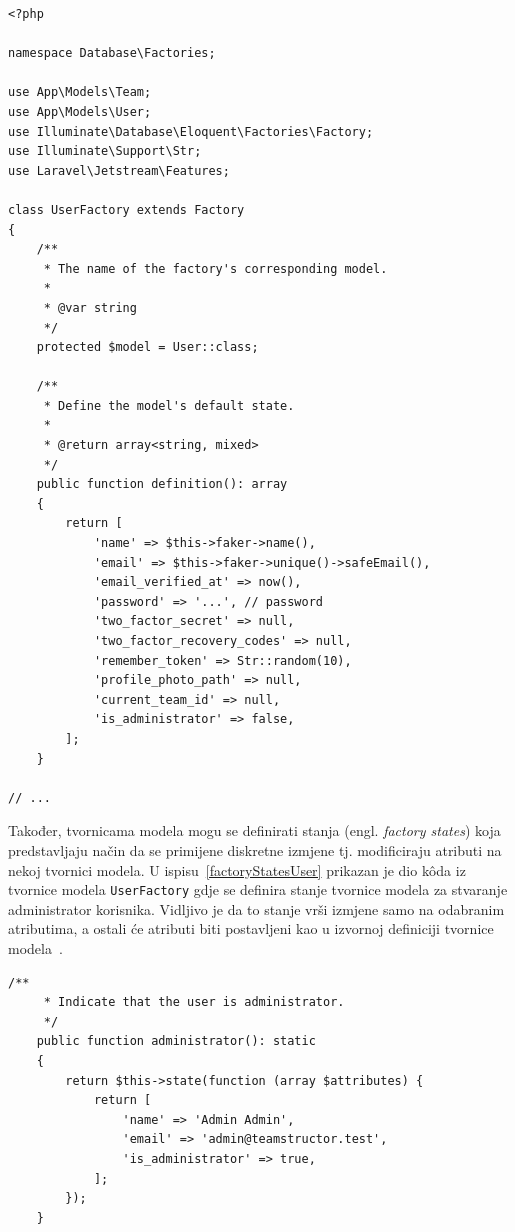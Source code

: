 \begin{lstlisting}[caption={Dio k\^oda tvornice modela \texttt{UserFactory}}, label=factoryUser]
<?php

namespace Database\Factories;

use App\Models\Team;
use App\Models\User;
use Illuminate\Database\Eloquent\Factories\Factory;
use Illuminate\Support\Str;
use Laravel\Jetstream\Features;

class UserFactory extends Factory
{
    /**
     * The name of the factory's corresponding model.
     *
     * @var string
     */
    protected $model = User::class;

    /**
     * Define the model's default state.
     *
     * @return array<string, mixed>
     */
    public function definition(): array
    {
        return [
            'name' => $this->faker->name(),
            'email' => $this->faker->unique()->safeEmail(),
            'email_verified_at' => now(),
            'password' => '...', // password
            'two_factor_secret' => null,
            'two_factor_recovery_codes' => null,
            'remember_token' => Str::random(10),
            'profile_photo_path' => null,
            'current_team_id' => null,
            'is_administrator' => false,
        ];
    }
    
// ...
\end{lstlisting}

Također, tvornicama modela mogu se definirati stanja (engl. \textit{factory states}) koja predstavljaju način da se primijene diskretne izmjene tj. modificiraju atributi na nekoj tvornici modela. U ispisu~\ref{factoryStatesUser} prikazan je dio k\^oda iz tvornice modela \texttt{UserFactory} gdje se definira stanje tvornice modela za stvaranje administrator korisnika. Vidljivo je da to stanje vrši izmjene samo na odabranim atributima, a ostali će atributi biti postavljeni kao u izvornoj definiciji tvornice modela~\cite{factories}.

\begin{lstlisting}[caption={Dio k\^oda tvornice modela \texttt{UserFactory} koji prikazuje definiciju stanja tvornice modela}, label=factoryStatesUser]
    /**
     * Indicate that the user is administrator.
     */
    public function administrator(): static
    {
        return $this->state(function (array $attributes) {
            return [
                'name' => 'Admin Admin',
                'email' => 'admin@teamstructor.test',
                'is_administrator' => true,
            ];
        });
    }
\end{lstlisting}

